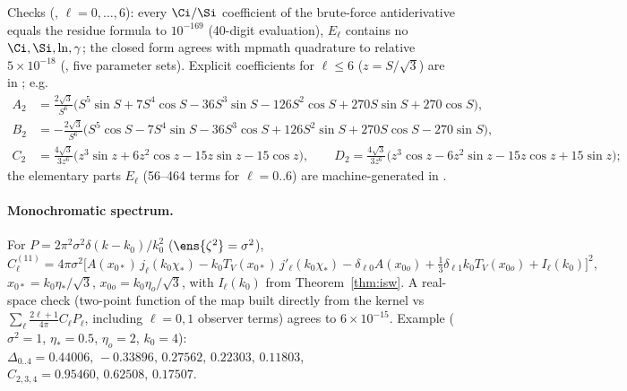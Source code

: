 Checks (, $\ell=0,\dots,6$): every $\Ci/\Si$ coefficient of the brute-force antiderivative equals the residue
formula to $10^{-169}$ (40-digit evaluation), $E_\ell$ contains no $\Ci,\Si,\ln,\gamma$; the closed form agrees with mpmath quadrature
to relative $5\times10^{-18}$ (, five parameter sets).  Explicit coefficients for $\ell\le6$
($z=S/\sqrt3$) are in ; e.g.
\begin{align*}
A_2&=\tfrac{2\sqrt3}{S^6}\big(S^5\sin S+7S^4\cos S-36S^3\sin S-126S^2\cos S+270S\sin S+270\cos S\big),\\
B_2&=-\tfrac{2\sqrt3}{S^6}\big(S^5\cos S-7S^4\sin S-36S^3\cos S+126S^2\sin S+270S\cos S-270\sin S\big),\\
C_2&=\tfrac{4\sqrt3}{3z^6}\big(z^3\sin z+6z^2\cos z-15z\sin z-15\cos z\big),\qquad
D_2=\tfrac{4\sqrt3}{3z^6}\big(z^3\cos z-6z^2\sin z-15z\cos z+15\sin z\big);
\end{align*}
the elementary parts $E_\ell$ (56--464 terms for $\ell=0..6$) are machine-generated in .

\paragraph{Monochromatic spectrum.}  For $P=2\pi^2\sigma^2\delta(k-k_0)/k_0^2$ ($\ens{\zeta^2}=\sigma^2$),
\begin{equation}
C_\ell^{(11)}=4\pi\sigma^2\Big[A(x_{0*})\,j_\ell(k_0\chi_*)-k_0T_V(x_{0*})\,j'_\ell(k_0\chi_*)-\delta_{\ell0}A(x_{0o})+\tfrac13\delta_{\ell1}k_0T_V(x_{0o})+I_\ell(k_0)\Big]^2,
\end{equation}
$x_{0*}=k_0\eta_*/\sqrt3$, $x_{0o}=k_0\eta_o/\sqrt3$, with $I_\ell(k_0)$ from Theorem~\ref{thm:isw}.  A real-space check (two-point function
of the map built directly from the kernel vs $\sum_\ell\frac{2\ell+1}{4\pi}C_\ell P_\ell$, including $\ell=0,1$ observer terms) agrees to
$6\times10^{-15}$.  Example ($\sigma^2=1$, $\eta_*=0.5$, $\eta_o=2$, $k_0=4$): $\Delta_{0..4}=0.44006,\,-0.33896,\,0.27562,\,0.22303,\,0.11803$,
$C_{2,3,4}=0.95460,\,0.62508,\,0.17507$.

